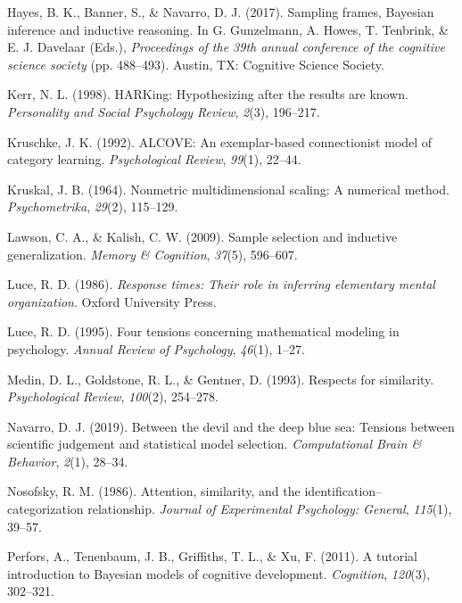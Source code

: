 \documentclass[
  english,
  doc]{apa6}
\begin{document}
\leavevmode\hypertarget{ref-hayes2017sampling}{}%
Hayes, B. K., Banner, S., \& Navarro, D. J. (2017). Sampling frames, Bayesian inference and inductive reasoning. In G. Gunzelmann, A. Howes, T. Tenbrink, \& E. J. Davelaar (Eds.), \emph{Proceedings of the 39th annual conference of the cognitive science society} (pp. 488--493). Austin, TX: Cognitive Science Society.

\leavevmode\hypertarget{ref-kerr1998harking}{}%
Kerr, N. L. (1998). HARKing: Hypothesizing after the results are known. \emph{Personality and Social Psychology Review}, \emph{2}(3), 196--217.

\leavevmode\hypertarget{ref-kruschke1992alcove}{}%
Kruschke, J. K. (1992). ALCOVE: An exemplar-based connectionist model of category learning. \emph{Psychological Review}, \emph{99}(1), 22--44.

\leavevmode\hypertarget{ref-kruskal1964nonmetric}{}%
Kruskal, J. B. (1964). Nonmetric multidimensional scaling: A numerical method. \emph{Psychometrika}, \emph{29}(2), 115--129.

\leavevmode\hypertarget{ref-lawson2009sample}{}%
Lawson, C. A., \& Kalish, C. W. (2009). Sample selection and inductive generalization. \emph{Memory \& Cognition}, \emph{37}(5), 596--607.

\leavevmode\hypertarget{ref-luce1986response}{}%
Luce, R. D. (1986). \emph{Response times: Their role in inferring elementary mental organization}. Oxford University Press.

\leavevmode\hypertarget{ref-luce1995four}{}%
Luce, R. D. (1995). Four tensions concerning mathematical modeling in psychology. \emph{Annual Review of Psychology}, \emph{46}(1), 1--27.

\leavevmode\hypertarget{ref-medin1993respects}{}%
Medin, D. L., Goldstone, R. L., \& Gentner, D. (1993). Respects for similarity. \emph{Psychological Review}, \emph{100}(2), 254--278.

\leavevmode\hypertarget{ref-navarro2019between}{}%
Navarro, D. J. (2019). Between the devil and the deep blue sea: Tensions between scientific judgement and statistical model selection. \emph{Computational Brain \& Behavior}, \emph{2}(1), 28--34.

\leavevmode\hypertarget{ref-nosofsky1986attention}{}%
Nosofsky, R. M. (1986). Attention, similarity, and the identification--categorization relationship. \emph{Journal of Experimental Psychology: General}, \emph{115}(1), 39--57.

\leavevmode\hypertarget{ref-perfors2011tutorial}{}%
Perfors, A., Tenenbaum, J. B., Griffiths, T. L., \& Xu, F. (2011). A tutorial introduction to Bayesian models of cognitive development. \emph{Cognition}, \emph{120}(3), 302--321.
\end{document}
